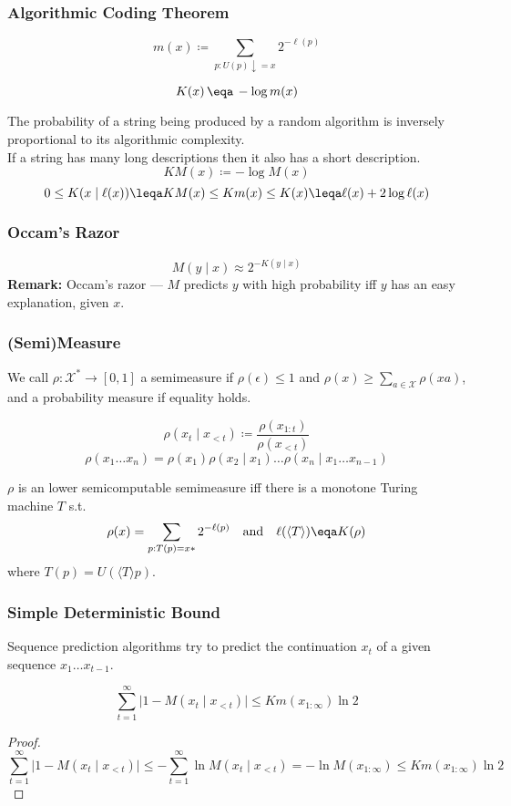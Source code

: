 \documentclass[UTF8,11pt,colorlinks,compress,openany]{beamer}%
\begin{document}
\begin{frame}\frametitle{Algorithmic Coding Theorem}
	\begin{block}{}
	\[m(x)\coloneqq \sum\limits_{p:U(p)\downarrow=x}2^{-\ell(p)}\]
	\end{block}
	\begin{theorem}
		\[K(x)\,\eqa\,-\log m(x)\]
	\end{theorem}
	The probability of a string being produced by a random algorithm is inversely proportional to its algorithmic complexity.\\
	If a string has many long descriptions then it also has a short description.
	\[KM(x)\coloneqq -\log M(x)\]
	\[0\leq K(x\mid \ell(x))\leqa KM(x)\leq Km(x)\leq K(x)\leqa\ell(x)+2\log\ell(x)\]
\end{frame}

\begin{frame}\frametitle{Occam's Razor}
	\[M(y\mid x)\approx 2^{-K(y\mid x)}\]
	\textbf{Remark:} Occam's razor --- $M$ predicts $y$ with high probability iff $y$ has an easy explanation, given $x$.
\end{frame}

\begin{frame}\frametitle{(Semi)Measure}
\begin{definition}
We call $\rho:\mathcal{X}^*\to[0,1]$ a semimeasure if $\rho(\epsilon)\leq 1$ and $\rho(x)\geq\sum\limits_{a\in\mathcal{X}}\rho(xa)$, and a probability measure if equality holds.
\end{definition}
\[\rho(x_t\mid x_{<t})\coloneqq\frac{\rho(x_{1:t})}{\rho(x_{<t})}\]
\[\rho(x_1\dots x_n)=\rho(x_1)\rho(x_2\mid x_1)\dots\rho(x_n\mid x_1\dots x_{n-1})\]
\begin{block}{}
$\rho$ is an lower semicomputable semimeasure iff there is a monotone Turing machine $T$ s.t. 
\[\rho(x)=\sum\limits_{p:T(p)=x*}2^{-\ell(p)}\quad\mbox{and}\quad\ell(\langle T\rangle)\eqa K(\rho)\]
where $T(p)=U(\langle T\rangle p)$.	
\end{block}
\end{frame}

\begin{frame}\frametitle{Simple Deterministic Bound}
Sequence prediction algorithms try to predict the continuation $x_t$ of a given sequence $x_1\dots x_{t-1}$.
\begin{theorem}
\[
\sum\limits_{t=1}^\infty\big|1-M(x_t\mid x_{<t})\big| \leq Km(x_{1:\infty})\ln 2
\]
\end{theorem}
\begin{proof}
\[\sum\limits_{t=1}^\infty\big|1-M(x_t\mid x_{<t})\big| \leq -\sum\limits_{t=1}^\infty\ln M(x_t\mid x_{<t}) = -\ln M(x_{1:\infty}) \leq Km(x_{1:\infty})\ln2 \]
\end{proof}
\end{frame}
\end{document}
